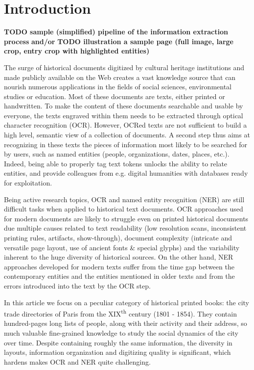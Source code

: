 \section{Introduction}

\textbf{TODO sample (simplified) pipeline of the information extraction process}
\textbf{and/or}
\textbf{TODO illustration a sample page (full image, large crop, entry crop with highlighted entities)}

The surge of historical documents digitized by cultural heritage institutions and made publicly available on the Web creates a vast knowledge source that can nourish numerous applications in the fields of social sciences, environmental studies or education.
Most of these documents are texts, either printed or handwritten.
To make the content of these documents searchable and usable by everyone, the texts engraved within them needs to be extracted through optical character recognition (OCR). 
However, OCRed texts are not sufficient to build a high level, semantic view of a collection of documents. A second step thus aims at recognizing in these texts the pieces of information most likely to be searched for by users, such as named entities (people, organizations, dates, places, etc.). Indeed, being able to properly tag text tokens unlocks the ability to relate entities, and provide colleagues from e.g. digital humanities with databases ready for exploitation.

Being active research topics, OCR and named entity recognition (NER) are still difficult tasks when applied to historical text documents.
OCR approaches used for modern documents are likely to struggle even on printed historical documents due multiple causes related to text readability (low resolution scans, inconsistent printing rules, artifacts, show-through), document complexity (intricate and versatile page layout, use of ancient fonts \& special glyphs) and the variability inherent to the huge diversity of historical sources.
On the other hand, NER approaches developed for modern texts suffer from the time gap between the contemporary entities and the entities mentioned in older texts and from the errors introduced into the text by the OCR step.

In this article we focus on a peculiar category of historical printed books: the city trade directories of Paris from the XIX\textsuperscript{th} century (1801 - 1854).
They contain hundred-pages long lists of people, along with their activity and their address, so much valuable fine-grained knowledge to study the social dynamics of the city over time.
Despite containing roughly the same information, the diversity in layouts, information organization and digitizing quality is significant, which hardens makes OCR and NER quite challenging.


